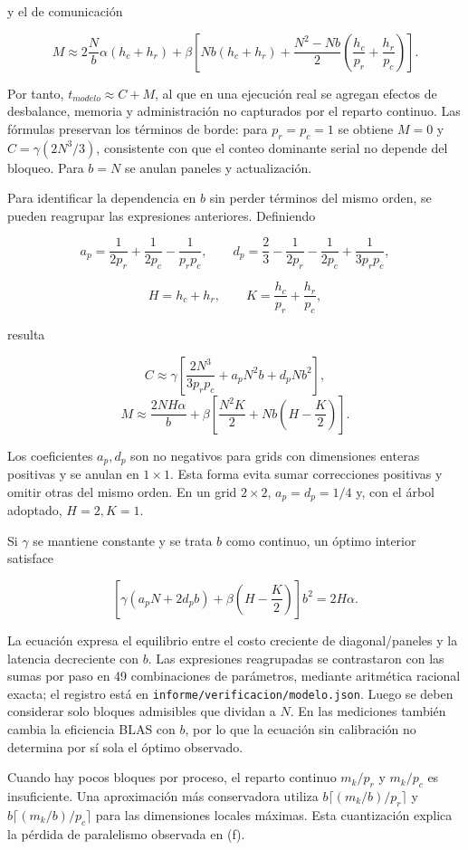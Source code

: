 \documentclass[
  spanish,
  11pt,
  a4paper,
]{article}
\begin{document}
y el de comunicación

\[M\approx 2\frac{N}{b}\alpha(h_c+h_r)+\beta\left[Nb(h_c+h_r)+\frac{N^2-Nb}{2}\left(\frac{h_c}{p_r}+\frac{h_r}{p_c}\right)\right].\]

Por tanto, \(t_{modelo}\approx C+M\), al que en una ejecución real se
agregan efectos de desbalance, memoria y administración no capturados
por el reparto continuo. Las fórmulas preservan los términos de borde:
para \(p_r=p_c=1\) se obtiene \(M=0\) y \(C=\gamma(2N^3/3)\),
consistente con que el conteo dominante serial no depende del bloqueo.
Para \(b=N\) se anulan paneles y actualización.

Para identificar la dependencia en \(b\) sin perder términos del mismo
orden, se pueden reagrupar las expresiones anteriores. Definiendo

\[a_p=\frac1{2p_r}+\frac1{2p_c}-\frac1{p_rp_c},\qquad
 d_p=\frac23-\frac1{2p_r}-\frac1{2p_c}+\frac1{3p_rp_c},\]

\[H=h_c+h_r,\qquad K=\frac{h_c}{p_r}+\frac{h_r}{p_c},\]

resulta

\[C\approx\gamma\left[\frac{2N^3}{3p_rp_c}+a_pN^2b+d_pNb^2\right],\]
\[M\approx\frac{2NH\alpha}{b}+\beta\left[\frac{N^2K}{2}+Nb\left(H-\frac K2\right)\right].\]

Los coeficientes \(a_p,d_p\) son no negativos para grids con dimensiones
enteras positivas y se anulan en \(1\times1\). Esta forma evita sumar
correcciones positivas y omitir otras del mismo orden. En un grid
\(2\times2\), \(a_p=d_p=1/4\) y, con el árbol adoptado, \(H=2,K=1\).

Si \(\gamma\) se mantiene constante y se trata \(b\) como continuo, un
óptimo interior satisface

\[\left[\gamma(a_pN+2d_pb)+\beta\left(H-\frac K2\right)\right]b^2=2H\alpha.\]

La ecuación expresa el equilibrio entre el costo creciente de
diagonal/paneles y la latencia decreciente con \(b\). Las expresiones
reagrupadas se contrastaron con las sumas por paso en 49 combinaciones
de parámetros, mediante aritmética racional exacta; el registro está en
\texttt{informe/verificacion/modelo.json}. Luego se deben considerar
solo bloques admisibles que dividan a \(N\). En las mediciones también
cambia la eficiencia BLAS con \(b\), por lo que la ecuación sin
calibración no determina por sí sola el óptimo observado.

Cuando hay pocos bloques por proceso, el reparto continuo \(m_k/p_r\) y
\(m_k/p_c\) es insuficiente. Una aproximación más conservadora utiliza
\(b\lceil(m_k/b)/p_r\rceil\) y \(b\lceil(m_k/b)/p_c\rceil\) para las
dimensiones locales máximas. Esta cuantización explica la pérdida de
paralelismo observada en (f).
\end{document}
